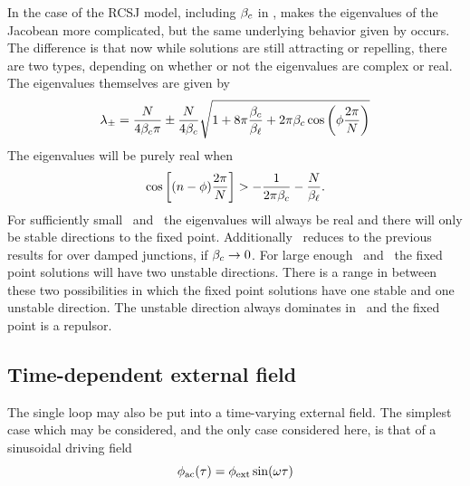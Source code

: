 %
%
In the case of the RCSJ model, including $\beta_c$ in
, makes the eigenvalues of the Jacobean 
more complicated,
but the same underlying behavior given by 
occurs. The difference is that now while solutions are still
attracting or repelling, there are two types, depending on whether
or not the eigenvalues are complex or real. 
The eigenvalues themselves are given by
%
\begin{equation}
\label{eqn:fulleigenvalues}
\lambda_\pm = {N \over 4 \beta_c \pi} \pm {N \over 4 \ensuremath{\beta_c}} 
        \sqrt{1 + 8 \pi {\ensuremath{\beta_c}\over  \ensuremath{\beta_\ell}}
               + 2 \pi \beta_c \cos \left(\phi {2 \pi \over N} 
                     \right)}
\end{equation}
%
The eigenvalues will
be purely real when
%
\begin{equation}
\label{eqn:undrivenrealeigen}
\cos \left[ (n-\phi) {2 \pi \over N} \right] > - {1 \over 2 \pi \beta_c} 
                                              - {N \over \beta_\ell}
\mathrm{.}
\end{equation}
%
For sufficiently small \betal\ and \betac\ the eigenvalues will always 
be real and there will only be stable directions to the fixed point.
Additionally \ 
reduces to the previous results for over damped junctions, if 
$\beta_c \rightarrow 0$. For large
enough \betal\ and \betac\ the fixed point solutions will have two
unstable directions. There is a range in between these
two possibilities in which the fixed point solutions have one stable
and one unstable direction. The unstable direction always dominates
in \EqnRef{eqn:fulleigenvalues}\ and the fixed point is  a
repulsor. 


\subsection{Time-dependent external field}

The single loop may also be put into a time-varying external field. 
The simplest case which may be considered, and the only case considered
here, is that of a sinusoidal 
driving field
%
\begin{equation}
\label{eqn:sindrive}
\phi_\mathrm{ac}(\tau) = \phi_{\mathrm{ext}} \sin (\omega \tau)
\end{equation}
%


